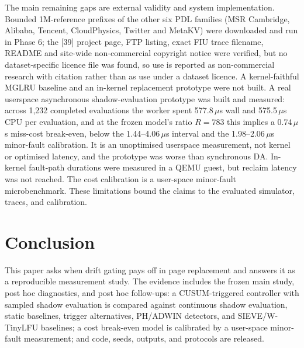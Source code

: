 \documentclass[10pt,twocolumn,a4paper]{IEEEtran}
\begin{document}
The main remaining gaps are external validity and system implementation.
Bounded 1M-reference prefixes of the other six PDL families (MSR Cambridge,
Alibaba, Tencent, CloudPhysics, Twitter and MetaKV) were downloaded and run in
Phase 6; the [39] project page, FTP listing, exact FIU trace filename, README
and site-wide non-commercial copyright notice were verified, but no
dataset-specific licence file was found, so use is reported as non-commercial
research with citation rather than as use under a dataset licence. A
kernel-faithful MGLRU baseline and an in-kernel replacement prototype were not
built. A real userspace asynchronous shadow-evaluation prototype was built and
measured: across 1{,}232 completed evaluations the worker spent 577.8\,$\mu$s
wall and 575.5\,$\mu$s CPU per evaluation, and at the frozen model's ratio
$R=783$ this implies a 0.74\,$\mu$s miss-cost break-even, below the
1.44--4.06\,$\mu$s interval and the 1.98--2.06\,$\mu$s minor-fault calibration.
It is an unoptimised userspace measurement, not kernel or optimised latency,
and the prototype was worse than synchronous DA. In-kernel fault-path
durations were measured in a QEMU guest, but reclaim latency was not reached.
The cost calibration is a user-space minor-fault microbenchmark. These
limitations bound the claims to the evaluated simulator, traces, and calibration.

\section{Conclusion}
\label{sec:conclusion}

This paper asks when drift gating pays off in page replacement and answers it
as a reproducible measurement study. The evidence includes the frozen main
study, post hoc diagnostics, and post hoc follow-ups: a CUSUM-triggered
controller with sampled shadow evaluation is compared against continuous
shadow evaluation, static baselines, trigger alternatives, PH/ADWIN detectors,
and SIEVE/W-TinyLFU baselines; a cost break-even model is calibrated by a
user-space minor-fault measurement; and code, seeds, outputs, and protocols are
released.
\end{document}
